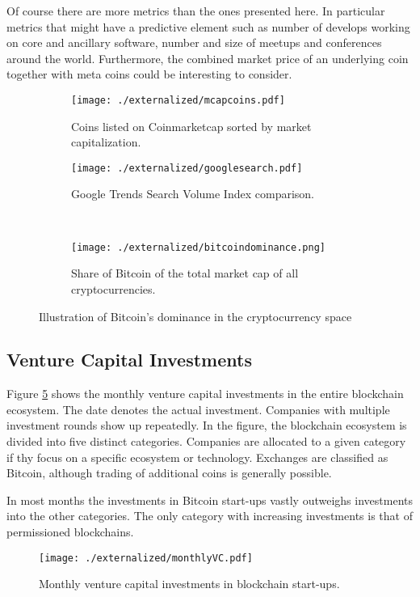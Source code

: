 Of course there are more metrics than the ones presented here. In particular metrics that might have a predictive element such as number of develops working on core and ancillary software, number and size of meetups and conferences around the world. Furthermore, the combined market price of an underlying coin together with meta coins could be interesting to consider. 


\begin{figure}[ht]
  \centering
  \begin{subfigure}[t]{0.5\linewidth}
    \centering
	\texttt{[image: ./externalized/mcapcoins.pdf]}
	\caption{Coins listed on Coinmarketcap sorted by market capitalization.}
	\label{fig:eco:mcap}
  \end{subfigure}
  \begin{subfigure}[t]{0.5\linewidth}
  	\centering
	\texttt{[image: ./externalized/googlesearch.pdf]}
	\caption{Google Trends Search Volume Index comparison.}
	\label{fig:eco:googlesearch}
  \end{subfigure}%
  \\
  \begin{subfigure}[t]{\linewidth}
  	\centering
	\texttt{[image: ./externalized/bitcoindominance.png]}
	\caption{Share of Bitcoin of the total market cap of all cryptocurrencies.}
	\label{fig:eco:bitcoindominance}
  \end{subfigure}%
  \caption{Illustration of Bitcoin's dominance in the cryptocurrency space}
\end{figure}


\subsection{Venture Capital Investments}

Figure \ref{fig:eco:vcfund} shows the monthly venture capital investments in the entire blockchain ecosystem. The date denotes the actual investment. Companies with multiple investment rounds show up repeatedly. In the figure, the blockchain ecosystem is divided into five distinct categories. Companies are allocated to a given category if thy focus on a specific ecosystem or technology. Exchanges are classified as Bitcoin, although trading of additional coins is generally possible. 

In most months the investments in Bitcoin start-ups vastly outweighs investments into the other categories. The only category with increasing investments is that of permissioned blockchains.
\begin{figure}[ht]
\centering
\texttt{[image: ./externalized/monthlyVC.pdf]}
\caption{Monthly venture capital investments in blockchain start-ups.}
\label{fig:eco:vcfund}
\end{figure}

